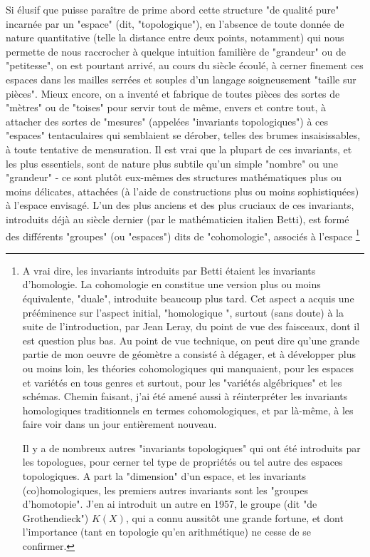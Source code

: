 Si élusif que puisse paraître de prime abord cette structure "de qualité pure" incarnée par un "espace" (dit, "topologique"), en l'absence de toute donnée de nature quantitative (telle la distance entre deux points, notamment) qui nous permette de nous raccrocher à quelque intuition familière de "grandeur" ou de "petitesse", on est pourtant arrivé, au cours du siècle écoulé, à cerner finement ces espaces dans les mailles serrées et souples d'un langage soigneusement "taille sur pièces". Mieux encore, on a inventé et fabrique de toutes pièces des sortes de "mètres" ou de "toises" pour servir tout de même, envers et contre tout, à attacher des sortes de "mesures" (appelées "invariants topologiques") à ces "espaces" tentaculaires qui semblaient se dérober, telles des brumes insaisissables, à toute tentative de mensuration. Il est vrai que la plupart de ces invariants, et les plus essentiels, sont de nature plus subtile qu'un simple "nombre" ou une "grandeur" - ce sont plutôt eux-mêmes des structures mathématiques plus ou moins délicates, attachées (à l'aide de constructions plus ou moins sophistiquées) à l'espace envisagé. L'un des plus anciens et des plus cruciaux de ces invariants, introduits déjà au siècle dernier (par le mathématicien italien Betti), est formé des différents "groupes" (ou "espaces") dits de "cohomologie", associés à l'espace \footnote{A vrai dire, les invariants introduits par Betti étaient les invariants d'homologie. La cohomologie en constitue une version plus ou moins équivalente, "duale", introduite beaucoup plus tard. Cet aspect a acquis une prééminence sur l'aspect initial, "homologique ", surtout (sans doute) à la suite de l'introduction, par Jean Leray, du point de vue des faisceaux, dont il est question plus bas. Au point de vue technique, on peut dire qu'une grande partie de mon oeuvre de géomètre a consisté à dégager, et à développer plus ou moins loin, les théories cohomologiques qui manquaient, pour les espaces et variétés en tous genres et surtout, pour les "variétés algébriques" et les schémas. Chemin faisant, j'ai été amené aussi à réinterpréter les invariants homologiques traditionnels en termes cohomologiques, et par là-même, à les faire voir dans un jour entièrement nouveau.

Il y a de nombreux autres "invariants topologiques" qui ont été introduits par les topologues, pour cerner tel type de propriétés ou tel autre des espaces topologiques. A part la "dimension" d'un espace, et les invariants (co)homologiques, les premiers autres invariants sont les "groupes d'homotopie". J'en ai introduit un autre en 1957, le groupe (dit "de Grothendieck") $K(X)$, qui a connu aussitôt une grande fortune, et dont l'importance (tant en topologie qu'en arithmétique) ne cesse de se confirmer.

}
